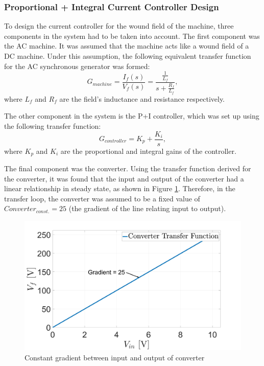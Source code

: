         \subsubsection{Proportional + Integral Current Controller Design}
            To design the current controller for the wound field of the machine, three components in the system had to be taken into account. The first component was the AC machine. It was assumed that the machine acts like a wound field of a DC machine. Under this assumption, the following equivalent transfer function for the AC synchronous generator was formed:
            \begin{equation}
                G_{machine} = \frac{I_f(s)}{V_f(s)} = \frac{\frac{1}{L_f}}{s+\frac{R_f}{L_f}},
            \end{equation}
            where \(L_f\) and \(R_f\) are the field's inductance and resistance respectively. 

            The other component in the system is the P+I controller, which was set up using the following transfer function:
            \begin{equation}
                G_{controller} = K_p + \frac{K_i}{s},
            \end{equation}
            where \(K_p\) and \(K_i\) are the proportional and integral gains of the controller.

            The final component was the converter. Using the transfer function derived for the converter, it was found that the input and output of the converter had a linear relationship in steady state, as shown in Figure \ref{fig: converter grad}. Therefore, in the transfer loop, the converter was assumed to be a fixed value of \(Converter_{const.} = 25\) (the gradient of the line relating input to output).
            \begin{figure}
                \centering
                \includegraphics[width=0.5\linewidth]{PEMDT Exam Report/img/gradientconverter.jpg}
                \caption{Constant gradient between input and output of converter}
                \label{fig: converter grad}
            \end{figure}

